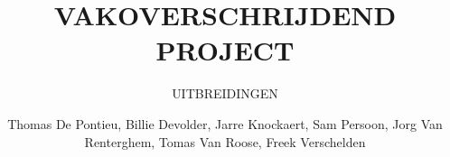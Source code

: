 \documentclass[a4paper, twoside, 12pt]{ugent_report}
\begin{document}
\title{VAKOVERSCHRIJDEND PROJECT}
\subtitle{UITBREIDINGEN\\}
\author{Thomas De Pontieu, Billie Devolder, Jarre Knockaert, Sam Persoon, Jorg Van Renterghem, Tomas Van Roose, Freek Verschelden}
\maketitle

\restoregeometry
\newpage\null\thispagestyle{empty}\newpage
\end{document}
